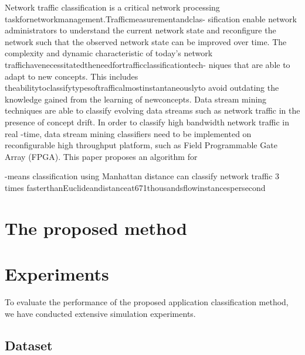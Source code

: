\documentclass[10pt,journal,compsoc]{IEEEtran}
\begin{document}
Network traffic classification is a critical network processing
taskfornetworkmanagement.Trafficmeasurementandclas-
sification enable network administrators to understand the
current network state and reconfigure the network such that
the observed network state can be improved over time. The
complexity and dynamic characteristic of today’s network
traffichavenecessitatedtheneedfortrafficclassificationtech-
niques that are able to adapt to new concepts. This includes
theabilitytoclassifytypesoftrafficalmostinstantaneouslyto
avoid outdating the knowledge gained from the learning of
newconcepts.
Data stream mining techniques are able to classify evolving data streams such as network traffic in the presence of concept
drift. In order to classify high bandwidth network traffic in real
-time, data stream mining classifiers need to be implemented on
reconfigurable high throughput platform, such as Field Programmable Gate Array (FPGA). This paper proposes an algorithm for
%
%

-means classification using Manhattan distance can classify network traffic 3 times
fasterthanEuclideandistanceat671thousandsflowinstancespersecond


\section{The proposed method}


\section{Experiments}

To evaluate the performance of the proposed application classification method, we have conducted extensive simulation
experiments.


\subsection{Dataset}
\end{document}
